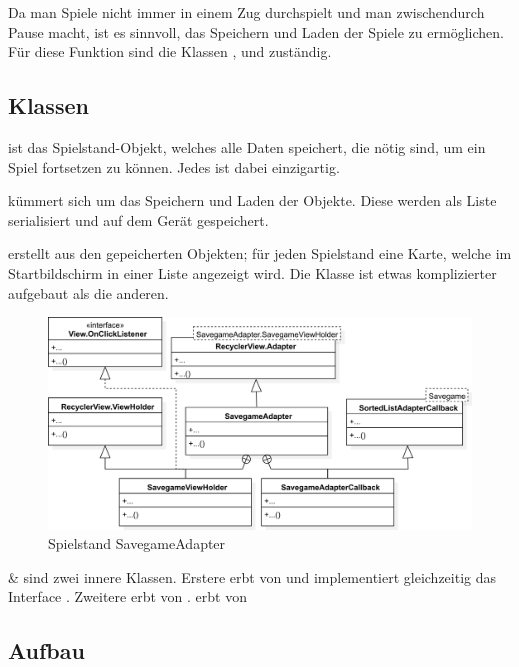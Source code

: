 Da man Spiele nicht immer in einem Zug durchspielt und man zwischendurch Pause
macht, ist es sinnvoll, das Speichern und Laden der Spiele zu ermöglichen. Für
diese Funktion sind die Klassen ,  und
 zuständig.

\subsection{Klassen}

 ist das Spielstand-Objekt, welches alle Daten speichert, die
nötig sind, um ein Spiel fortsetzen zu können. Jedes  ist dabei
einzigartig.

 kümmert sich um das Speichern und Laden der
 Objekte. Diese werden als Liste serialisiert und auf dem Gerät
gespeichert.

 erstellt aus den gepeicherten  Objekten;
für jeden Spielstand eine Karte, welche im Startbildschirm in einer Liste
angezeigt wird. Die Klasse ist etwas komplizierter aufgebaut als die anderen.

\begin{figure}[h]
	\centering
	\includegraphics[width=1.0\textwidth]{resources/savegamestorage/SavegameAdapter}
	\caption{Spielstand SavegameAdapter}
\end{figure}

 \&  sind zwei innere
Klassen. Erstere erbt von  und implementiert
gleichzeitig das Interface . Zweitere erbt von
.  erbt von

\subsection{Aufbau}
\subsectionauthor{\frank}

